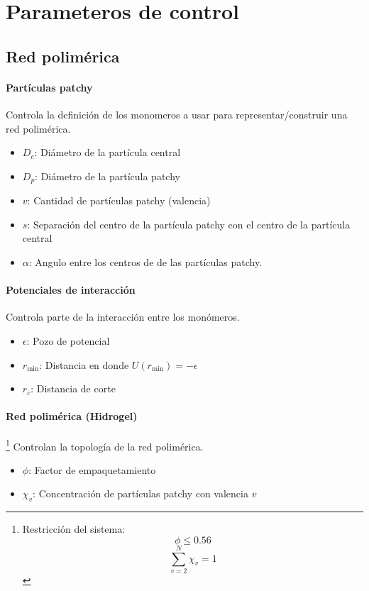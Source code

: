 \documentclass[../main.tex]{subfiles}
\begin{document}
\section{Parameteros de control}

\subsection{Red polimérica}

\paragraph{Partículas patchy}
Controla la definición de los monomeros a usar para representar/construir una red polimérica.

\begin{itemize}
    \item \(D_c\): Diámetro de la partícula central
    \item \(D_p\): Diámetro de la partícula patchy
    \item \(v\): Cantidad de partículas patchy (valencia)
    \item \(s\): Separación del centro de la partícula patchy con el centro de la partícula central
    \item \(\alpha\): Angulo entre los centros de de las partículas patchy. 
\end{itemize}

\paragraph{Potenciales de interacción}
Controla parte de la interacción entre los monómeros.

\begin{itemize}
    \item \(\epsilon\): Pozo de potencial
    \item \(r_{\min}\): Distancia en donde \(U(r_{\min})=-\epsilon\) 
    \item \(r_c\): Distancia de corte
\end{itemize}


\paragraph{Red polimérica (Hidrogel)}\footnote{Restricción del sistema: \[\phi\leq 0.56\] \[\sum_{v=2}^{N}\chi_v=1\]}
Controlan la topología de la red polimérica.

\begin{itemize}
    \item \(\phi\): Factor de empaquetamiento
    \item \(\chi_v\): Concentración de partículas patchy con valencia \(v\)
\end{itemize}
\end{document}
